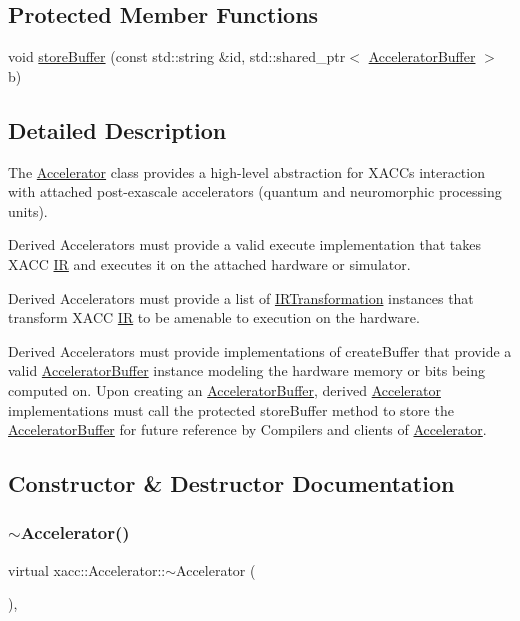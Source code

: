 \subsection*{Protected Member Functions}
\begin{DoxyCompactItemize}
\item 
void \hyperlink{a02432_ac3e781f42ec25e460174d4c41ea26b94}{store\+Buffer} (const std\+::string \&id, std\+::shared\+\_\+ptr$<$ \hyperlink{a02444}{Accelerator\+Buffer} $>$ b)
\end{DoxyCompactItemize}


\subsection{Detailed Description}
The \hyperlink{a02432}{Accelerator} class provides a high-\/level abstraction for X\+A\+CC\textquotesingle{}s interaction with attached post-\/exascale accelerators (quantum and neuromorphic processing units).

Derived Accelerators must provide a valid execute implementation that takes X\+A\+CC \hyperlink{a02480}{IR} and executes it on the attached hardware or simulator.

Derived Accelerators must provide a list of \hyperlink{a02484}{I\+R\+Transformation} instances that transform X\+A\+CC \hyperlink{a02480}{IR} to be amenable to execution on the hardware.

Derived Accelerators must provide implementations of create\+Buffer that provide a valid \hyperlink{a02444}{Accelerator\+Buffer} instance modeling the hardware memory or bits being computed on. Upon creating an \hyperlink{a02444}{Accelerator\+Buffer}, derived \hyperlink{a02432}{Accelerator} implementations must call the protected store\+Buffer method to store the \hyperlink{a02444}{Accelerator\+Buffer} for future reference by Compilers and clients of \hyperlink{a02432}{Accelerator}. 

\subsection{Constructor \& Destructor Documentation}
\mbox{\label{a02432_aed88ab0d71b765f0b0f512684ccd4b55}} 
\subsubsection{\texorpdfstring{$\sim$\+Accelerator()}{~Accelerator()}}
{\footnotesize\ttfamily virtual xacc\+::\+Accelerator\+::$\sim$\+Accelerator (\begin{DoxyParamCaption}{ }\end{DoxyParamCaption})\hspace{0.3cm}{\ttfamily [inline]}, {\ttfamily [virtual]}}

